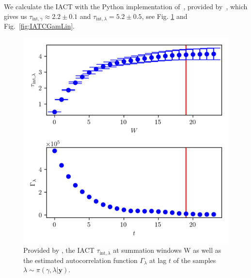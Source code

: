We calculate the IACT with the Python implementation of~\cite{wolff2004monte}, provided by~\cite{drikHesse}, which gives us $\tau_{\text{int}, \gamma} \approx 2.2 \pm 0.1$ and $\tau_{\text{int}, \lambda} = 5.2 \pm 0.5 $, see Fig. \ref{fig:IATCLamLin} and Fig.~\ref{fig:IATCGamLin}.
\begin{figure}[h!]
	\centering
	\includegraphics{UwerrTauIntFirstO3lam.png}
	\caption[IACT of $\lambda$ samples from $\pi(\gamma, \lambda| \bm{y})$, for linear model.]{Provided by \cite{drikHesse}, the IACT $\tau_{\text{int},\lambda}$ at summation windows W as well as the estimated autocorrelation function $\Gamma_{\lambda}$ at lag $t$ of the samples $\lambda \sim \pi(\gamma, \lambda| \bm{y})$.}
	\label{fig:IATCLamLin}
\end{figure}



